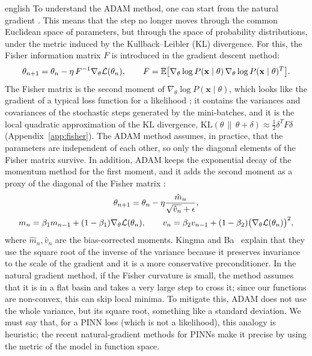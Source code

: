 \begin{hyphenrules}{english}
To understand the ADAM method, one can start from the natural gradient
\cite{amari1998,pascanu2013}. This means that the step no longer moves through the common Euclidean
space of parameters, but through the space of probability distributions, under the metric induced by
the Kullback--Leibler (KL) divergence. For this, the Fisher information matrix $F$ is introduced in the
gradient descent method:
\begin{equation}
  \theta_{n+1}=\theta_n-\eta\,F^{-1}\nabla_\theta\mathcal{L}(\theta_n),\qquad
  F=\mathbb{E}\big[\nabla_\theta\log P(\mathbf{x}\mid\theta)\,\nabla_\theta\log P(\mathbf{x}\mid\theta)^{T}\big].
  \label{eq:natural-gradient}
\end{equation}
The Fisher matrix is the second moment of $\nabla_\theta\log P(\mathbf{x}\mid\theta)$, which looks like the
gradient of a typical loss function for a likelihood \cite{amari1998}; it contains the variances and
covariances of the stochastic steps generated by the mini-batches, and it is the local quadratic
approximation of the KL divergence, $\mathrm{KL}(\theta\,\|\,\theta+\delta)\approx\frac12\delta^{T}F\delta$
(Appendix~\ref{app:fisher}). The ADAM method assumes, in practice, that the parameters are independent of each
other, so only the diagonal elements of the Fisher matrix survive. In addition, ADAM keeps the exponential
decay of the momentum method \cite{ruder2016} for the first moment, and it adds the second moment as
a proxy of the diagonal of the Fisher matrix \cite{kingma2015}:
\begin{equation}
  \begin{gathered}
  \theta_{n+1}=\theta_n-\eta\frac{\hat m_n}{\sqrt{\hat v_n}+\epsilon},\\
  m_n=\beta_1m_{n-1}+(1-\beta_1)\nabla_\theta\mathcal{L}(\theta_n),\qquad
  v_n=\beta_2v_{n-1}+(1-\beta_2)\big(\nabla_\theta\mathcal{L}(\theta_n)\big)^2,
  \end{gathered}
  \label{eq:adam}
\end{equation}
where $\hat m_n,\hat v_n$ are the bias-corrected moments. Kingma and Ba~\cite{kingma2015} explain that they use the
square root of the inverse of the variance because it preserves invariance to the scale of the gradient
and it is a more conservative preconditioner. In the natural gradient method, if the Fisher curvature is
small, the method assumes that it is in a flat basin and takes a very large step to cross it; since our
functions are non-convex, this can skip local minima. To mitigate this, ADAM does not use the whole
variance, but its square root, something like a standard deviation. We must say that, for a PINN loss
(which is not a likelihood), this analogy is heuristic; the recent natural-gradient methods for PINNs
\cite{schwencke2025anagram,schwencke2025thesis} make it precise by using the metric of the model in
function space.


\end{hyphenrules}

